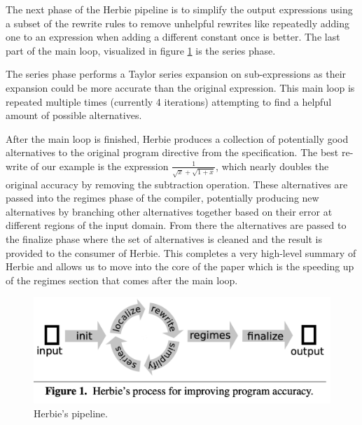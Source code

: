\documentclass{article}
\begin{document}
The next phase of the Herbie pipeline is to simplify the output expressions using a subset of the rewrite rules to remove unhelpful rewrites like repeatedly adding one to an expression when adding a different constant once is better. The last part of the main loop, visualized in figure \ref{fig:herbie-pipeline} is the series phase. 

The series phase performs a Taylor series expansion on sub-expressions as their expansion could be more accurate than the original expression. This main loop is repeated multiple times (currently 4 iterations) attempting to find a helpful amount of possible alternatives. 

After the main loop is finished, Herbie produces a collection of potentially good alternatives to the original program directive from the specification. The best re-write of our example is the expression $\frac{1}{\sqrt{x} + \sqrt{1 + x}}$, which nearly doubles the original accuracy by removing the subtraction operation. These alternatives are passed into the regimes phase of the compiler, potentially producing new alternatives by branching other alternatives together based on their error at different regions of the input domain. From there the alternatives are passed to the finalize phase where the set of alternatives is cleaned and the result is provided to the consumer of Herbie. This completes a very high-level summary of Herbie and allows us to move into the core of the paper which is the speeding up of the regimes section that comes after the main loop.

\begin{figure}[htbp]
\begin{center}
\includegraphics[scale=0.5]{herbie-pipeline.png}
\caption{Herbie's pipeline.}
\label{fig:herbie-pipeline}
\end{center}
\end{figure}
\end{document}
